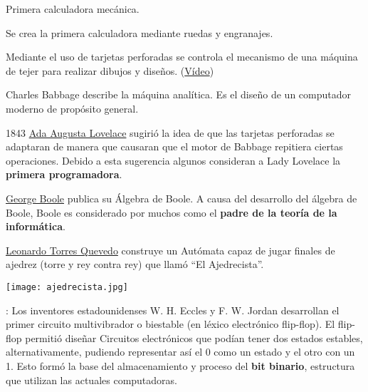 \begin{description}
    \item[1623] Primera calculadora mecánica.

    \item[1666] Se crea la primera calculadora mediante ruedas y engranajes.

    \item[1801] Mediante el uso de tarjetas perforadas se controla el mecanismo de una máquina de tejer para realizar dibujos y diseños. (\href{https://www.youtube.com/watch?v=MQzpLLhN0fY}{Vídeo})

    \item[1837] Charles Babbage describe la máquina analítica. Es el diseño de un computador moderno de propósito general.

    \begin{minipage}{0.7\linewidth}
        \item[1843] \href{https://es.wikipedia.org/wiki/Ada_Lovelace}{Ada Augusta Lovelace} sugirió la idea de que las tarjetas perforadas se adaptaran de manera que causaran que el motor de Babbage repitiera ciertas operaciones. Debido a esta sugerencia algunos consideran a Lady Lovelace la \textbf{primera programadora}.
    \end{minipage}
    \hfill
    \begin{minipage}{0.2\linewidth}
        
    \end{minipage}

    \item[1854] \href{https://es.wikipedia.org/wiki/George_Boole}{George Boole} publica su Álgebra de Boole. A causa del desarrollo del álgebra de Boole, Boole es considerado por muchos como el \textbf{padre de la teoría de la informática}.

    \item[1912] \href{https://es.wikipedia.org/wiki/Leonardo_Torres_Quevedo}{Leonardo Torres Quevedo} construye un Autómata capaz de jugar finales de ajedrez (torre y rey contra rey)  que llamó “El Ajedrecista”.

    \begin{center}
        \texttt{[image: ajedrecista.jpg]}
    \end{center}

    \item[1919]: Los inventores estadounidenses W. H. Eccles y F. W. Jordan desarrollan el primer circuito multivibrador o biestable (en léxico electrónico flip-flop). El flip-flop permitió diseñar Circuitos electrónicos que podían tener dos estados estables, alternativamente, pudiendo representar así el 0 como un estado y el otro con un 1. Esto formó la base del almacenamiento y proceso del \textbf{bit binario}, estructura que utilizan las actuales computadoras.


\end{description}
